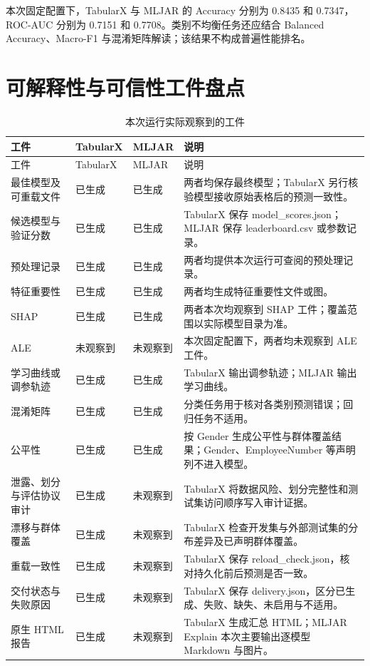 \documentclass[degree=bachelor,language=chinese,fontset=fandol]{thuthesis}
\newcommand{\yes}{\textcolor{green!50!black}{已生成}}
\newcommand{\no}{\textcolor{red!70!black}{未观察到}}
\begin{document}
本次固定配置下，TabularX 与 MLJAR 的 Accuracy 分别为 0.8435 和 0.7347，ROC-AUC 分别为 0.7151 和 0.7708。类别不均衡任务还应结合 Balanced Accuracy、Macro-F1 与混淆矩阵解读；该结果不构成普遍性能排名。

\section{可解释性与可信性工件盘点}
\begin{longtable}{>{\raggedright\arraybackslash}p{}>{\centering\arraybackslash}p{}>{\centering\arraybackslash}p{}>{\raggedright\arraybackslash}p{}}
  \caption{本次运行实际观察到的工件}\label{tab:artifacts}\\
  \toprule
  工件 & TabularX & MLJAR & 说明 \\
  \midrule
  \endfirsthead
  \toprule
  工件 & TabularX & MLJAR & 说明 \\
  \midrule
  \endhead
  最佳模型及可重载文件 & \yes & \yes & 两者均保存最终模型；TabularX 另行核验模型接收原始表格后的预测一致性。 \\
  候选模型与验证分数 & \yes & \yes & TabularX 保存 model\_scores.json；MLJAR 保存 leaderboard.csv 或参数记录。 \\
  预处理记录 & \yes & \yes & 两者均提供本次运行可查阅的预处理记录。 \\
  特征重要性 & \yes & \yes & 两者均生成特征重要性文件或图。 \\
  SHAP & \yes & \yes & 两者本次均观察到 SHAP 工件；覆盖范围以实际模型目录为准。 \\
  ALE & \no & \no & 本次固定配置下，两者均未观察到 ALE 工件。 \\
  学习曲线或调参轨迹 & \yes & \yes & TabularX 输出调参轨迹；MLJAR 输出学习曲线。 \\
  混淆矩阵 & \yes & \yes & 分类任务用于核对各类别预测错误；回归任务不适用。 \\
  公平性 & \yes & \yes & 按 Gender 生成公平性与群体覆盖结果；Gender、EmployeeNumber 等声明列不进入模型。 \\
  泄露、划分与评估协议审计 & \yes & \no & TabularX 将数据风险、划分完整性和测试集访问顺序写入审计证据。 \\
  漂移与群体覆盖 & \yes & \no & TabularX 检查开发集与外部测试集的分布差异及已声明群体覆盖。 \\
  重载一致性 & \yes & \no & TabularX 保存 reload\_check.json，核对持久化前后预测是否一致。 \\
  交付状态与失败原因 & \yes & \no & TabularX 保存 delivery.json，区分已生成、失败、缺失、未启用与不适用。 \\
  原生 HTML 报告 & \yes & \no & TabularX 生成汇总 HTML；MLJAR Explain 本次主要输出逐模型 Markdown 与图片。 \\
  \bottomrule
\end{longtable}
\end{document}
